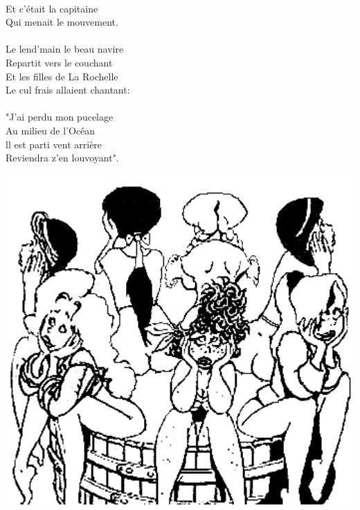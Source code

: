 \\Et c'était la capitaine
\\Qui menait le mouvement.
\\\\Le lend'main le beau navire
\\Repartit vers le couchant ~~~~~~\bissimple
\\Et les filles de La Rochelle
\\Le cul frais allaient chantant:
\\\\"J'ai perdu mon pucelage
\\Au milieu de l'Océan~~~~~~~ \bissimple
\\ll est parti vent arrière
\\Reviendra z'en louvoyant".
\\
\bigskip
\begin{center}
\includegraphics[width=1\textwidth]{images/rochelle.png}
\end{center}

\breakpage